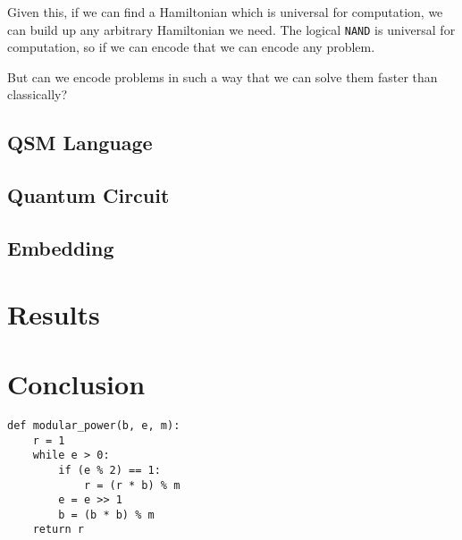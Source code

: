 \documentclass{article}
\begin{document}
Given this, if we can find a Hamiltonian which is universal for computation, we can build up any arbitrary Hamiltonian we need.  The logical
{\tt NAND} is universal for computation, so if we can encode that we can encode any problem.

But can we encode problems in such a way that we can solve them faster than classically?

\subsection{QSM Language}

\subsection{Quantum Circuit}

\subsection{Embedding}

\section{Results}

\section{Conclusion}

\begin{lstlisting}
def modular_power(b, e, m):
	r = 1
	while e > 0:
		if (e % 2) == 1:
			r = (r * b) % m
		e = e >> 1
		b = (b * b) % m
	return r
\end{lstlisting}

{}

\end{document}
